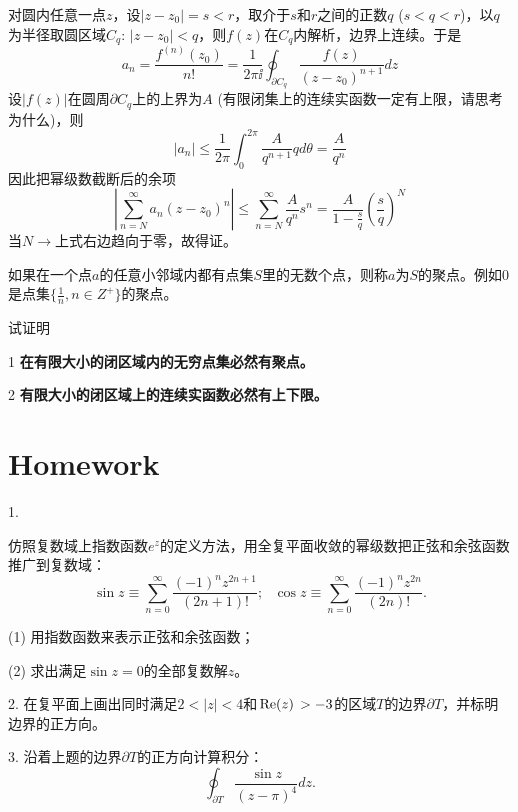\documentclass[CJK]{beamer}
\begin{document}
\begin{frame}
  \bch
 对圆内任意一点$z$，设$|z-z_0|=s<r$，取介于$s$和$r$之间的正数$q$ ($s<q<r$)，以$q$为半径取圆区域$C_q$: $|z-z_0|<q$，则$f(z)$在$C_q$内解析，边界上连续。于是
  $$ a_n = \frac{f^{(n)}(z_0)}{n!} = \frac{1}{2\pi \ii}\oint_{\partial C_q} \frac{f(z)}{(z-z_0)^{n+1}}dz $$
  设$|f(z)|$在圆周$\partial C_q$上的上界为$A$ (有限闭集上的连续实函数一定有上限，请思考为什么)，则
  $$ |a_n| \le \frac{1}{2\pi} \int_0^{2\pi} \frac{A}{q^{n+1}} qd\theta = \frac{A}{q^n} $$
  因此把幂级数截断后的余项
  $$ \left\vert \sum_{n=N}^\infty a_n (z-z_0)^n \right\vert \le \sum_{n=N}^\infty \frac{A}{q^n}s^n =\frac{A}{1-\frac{s}{q}} \left(\frac{s}{q}\right)^N$$
  当$N\rightarrow$上式右边趋向于零，故得证。
  \ech
\end{frame}


\begin{frame}
  \bch
  如果在一个点$a$的任意小邻域内都有点集$S$里的无数个点，则称$a$为$S$的聚点。例如$0$是点集$\{ \frac{1}{n}, n\in Z^+\}$的聚点。


  试证明
  \bitem
\item[1]{\bf 在有限大小的闭区域内的无穷点集必然有聚点。}
\item[2]{\bf 有限大小的闭区域上的连续实函数必然有上下限。}
  \eitem
  \ech
\end{frame}


\section{Homework}

\begin{frame}
\bch
    {\small
      
\bitem
\item[1.]{仿照复数域上指数函数$e^z$的定义方法，用全复平面收敛的幂级数把正弦和余弦函数推广到复数域：
  $$\sin z \equiv \sum_{n=0}^\infty \frac{(-1)^nz^{2n+1}}{(2n+1)!};\ \ \ \cos z \equiv \sum_{n=0}^\infty \frac{(-1)^nz^{2n}}{(2n)!}.$$
  \bitem
  \item[(1)]{ 用指数函数来表示正弦和余弦函数；}
  \item[(2)]{ 求出满足$\sin z = 0$的全部复数解$z$。}
    \eitem
    }
\item[2.]{在复平面上画出同时满足$2<|z|<4$和$\,\mathrm{Re}{\left(z\right)\,}>-3$的区域$T$的边界$\partial T$，并标明边界的正方向。} 
\item[3.]{沿着上题的边界$\partial T$的正方向计算积分：
  $$\oint_{\partial T} \frac{\sin z}{(z-\pi)^4}dz .$$
}
\eitem
 }
\ech
\end{frame}
\end{document}
